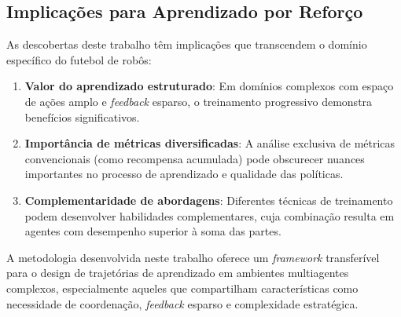 \subsection{Implicações para Aprendizado por Reforço}

As descobertas deste trabalho têm implicações que transcendem o domínio específico do futebol de robôs:

\begin{enumerate}
    \item \textbf{Valor do aprendizado estruturado}: Em domínios complexos com espaço de ações amplo e \textit{feedback} esparso, o treinamento progressivo demonstra benefícios significativos.
    
    \item \textbf{Importância de métricas diversificadas}: A análise exclusiva de métricas convencionais (como recompensa acumulada) pode obscurecer nuances importantes no processo de aprendizado e qualidade das políticas.
    
    \item \textbf{Complementaridade de abordagens}: Diferentes técnicas de treinamento podem desenvolver habilidades complementares, cuja combinação resulta em agentes com desempenho superior à soma das partes.
\end{enumerate}

A metodologia desenvolvida neste trabalho oferece um \textit{framework} transferível para o design de trajetórias de aprendizado em ambientes multiagentes complexos, especialmente aqueles que compartilham características como necessidade de coordenação, \textit{feedback} esparso e complexidade estratégica.
